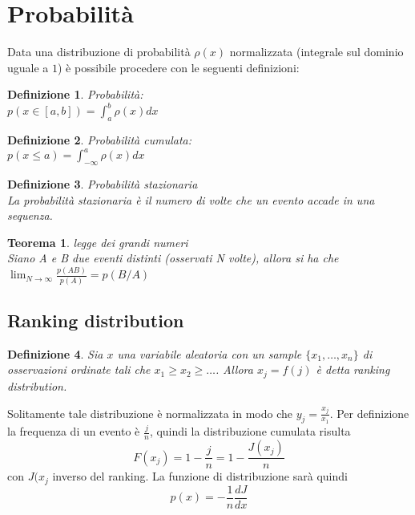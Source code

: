 \documentclass[12pt, a4paper]{book}
\theoremstyle{theorem}
\newtheorem{definition}{Definizione}[section]
\newtheorem{theorem}{Teorema}[section]
\begin{document}
		
		\section{Probabilità}
			Data una distribuzione di probabilità $\rho(x)$ normalizzata (integrale sul dominio uguale a $1$) è possibile procedere con le seguenti definizioni:
			\begin{definition} Probabilità:\\
				$p(x\in[a,b])=\int_{a}^{b}\rho(x)dx$
			\end{definition}
			\begin{definition} Probabilità cumulata:\\
				$p(x\leq a)=\int_{-\infty}^{a}\rho(x)dx$
			\end{definition}
			\begin{definition}
				Probabilità stazionaria\\
				La probabilità stazionaria è il numero di volte che un evento accade in una sequenza.
			\end{definition}
			\begin{theorem}
				legge dei grandi numeri\\
				Siano A e B due eventi distinti (osservati N volte), allora si ha che\\
				$\lim_{N\to\infty}\frac{p(AB)}{p(A)}=p(B/A)$
			\end{theorem}
			\subsection{Ranking distribution}
				\begin{definition}
					Sia $x$ una variabile aleatoria con un sample $\{x_{1},\ldots,x_{n}\}$ di osservazioni ordinate tali che $x_{1}\geq x_{2}\geq\ldots$.
					Allora $x_{j}=f(j)$ è detta ranking distribution.
				\end{definition}
				Solitamente tale distribuzione è normalizzata in modo che $y_{j}=\frac{x_{j}}{x_{1}}$.
				Per definizione la frequenza di un evento è $\frac{j}{n}$, quindi la distribuzione cumulata risulta
				\begin{equation}
					F(x_{j})=1-\frac{j}{n}=1-\frac{J(x_{j})}{n}
				\end{equation}
				con $J(x_{j}$ inverso del ranking.
				La funzione di distribuzione sarà quindi
				\begin{equation}
					p(x)=-\frac{1}{n}\frac{dJ}{dx}
				\end{equation}
		
\end{document}
